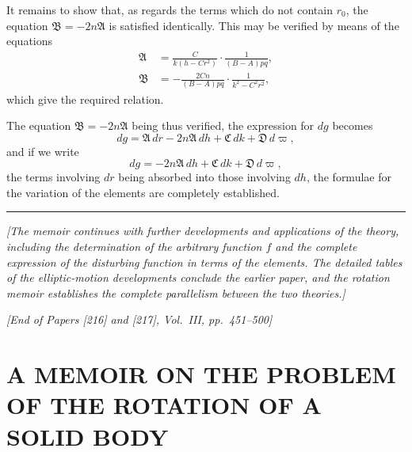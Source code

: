 \documentclass[11pt,a4paper]{book}
\begin{document}
{{It remains to show that, as regards the terms which do not contain $r_0$, the equation $\mathfrak{B} = -2n\mathfrak{A}$ is satisfied identically. This may be verified by means of the equations
\begin{align*}
\mathfrak{A} &= \frac{C}{k(h-Cr^2)} \cdot \frac{1}{(B-A)pq}, \\
\mathfrak{B} &= -\frac{2Cn}{(B-A)pq} \cdot \frac{1}{k^2-C^2r^2},
\end{align*}
which give the required relation.

The equation $\mathfrak{B} = -2n\mathfrak{A}$ being thus verified, the expression for $dg$ becomes
\[
dg = \mathfrak{A} \, dr - 2n\mathfrak{A} \, dh + \mathfrak{C} \, dk + \mathfrak{D} \, d\varpi,
\]
and if we write
\[
dg = -2n\mathfrak{A} \, dh + \mathfrak{C} \, dk + \mathfrak{D} \, d\varpi,
\]
the terms involving $dr$ being absorbed into those involving $dh$, the formulae for the variation of the elements are completely established.

\vspace{2em}

\begin{center}
\rule{0.5\textwidth}{0.4pt}
\end{center}

\vspace{1em}

\noindent\textit{[The memoir continues with further developments and applications of the theory, including the determination of the arbitrary function $f$ and the complete expression of the disturbing function in terms of the elements. The detailed tables of the elliptic-motion developments conclude the earlier paper, and the rotation memoir establishes the complete parallelism between the two theories.]}

\vspace{2em}

\begin{flushright}
\textit{[End of Papers [216] and [217], Vol.~III, pp.~451--500]}
\end{flushright}
\clearpage


\thispagestyle{empty}

\section{A MEMOIR ON THE PROBLEM OF THE ROTATION OF A SOLID BODY}

}}
\end{document}
